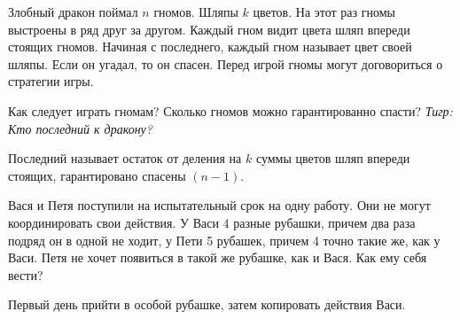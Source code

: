 \begin{problem}\par
Злобный дракон поймал $n$ гномов. Шляпы $k$ цветов. На этот раз гномы выстроены в ряд друг за другом. Каждый гном видит цвета шляп впереди стоящих гномов. Начиная с последнего, каждый гном называет цвет своей шляпы. Если он угадал, то он спасен. Перед игрой гномы могут договориться о стратегии игры. \par

Как следует играть гномам? Сколько гномов можно гарантированно спасти?
{\it Тигр: Кто последний к дракону?}

\begin{sol}
Последний называет остаток от деления на $k$ суммы цветов шляп впереди стоящих, гарантировано спасены $(n-1)$.
\end{sol}

\end{problem}



\begin{problem}
Вася и Петя поступили на испытательный срок на одну работу. Они не могут координировать свои действия. У Васи 4 разные рубашки, причем два раза подряд он в одной не ходит, у Пети 5 рубашек, причем 4 точно такие же, как у Васи. Петя не хочет появиться в такой же рубашке, как и Вася. Как ему себя вести? \par
\begin{sol}
Первый день прийти в особой рубашке, затем копировать действия Васи.
\end{sol}
\end{problem}




